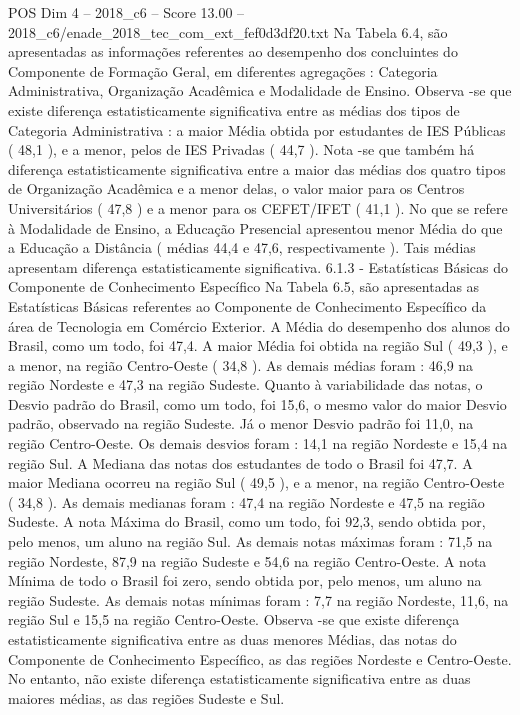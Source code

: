 \begin{textsample}{POS Dim 4 – 2018\_c6 – Score 13.00 – 2018\_c6/enade\_2018\_tec\_com\_ext\_fef0d3df20.txt}
Na Tabela 6.4, são apresentadas as informações referentes ao desempenho dos concluintes do Componente de Formação Geral, em diferentes agregações : Categoria Administrativa, Organização Acadêmica e Modalidade de Ensino.
Observa -se que existe diferença estatisticamente significativa entre as médias dos tipos de Categoria Administrativa : a maior Média obtida por estudantes de IES Públicas ( 48,1 ), e a menor, pelos de IES Privadas ( 44,7 ).
Nota -se que também há diferença estatisticamente significativa entre a maior das médias dos quatro tipos de Organização Acadêmica e a menor delas, o valor maior para os Centros Universitários ( 47,8 ) e a menor para os CEFET/IFET ( 41,1 ).
No que se refere à Modalidade de Ensino, a Educação Presencial apresentou menor Média do que a Educação a Distância ( médias 44,4 e 47,6, respectivamente ).
Tais médias apresentam diferença estatisticamente significativa. 6.1.3 - Estatísticas Básicas do Componente de Conhecimento Específico Na Tabela 6.5, são apresentadas as Estatísticas Básicas referentes ao Componente de Conhecimento Específico da área de Tecnologia em Comércio Exterior.
A Média do desempenho dos alunos do Brasil, como um todo, foi 47,4.
A maior Média foi obtida na região Sul ( 49,3 ), e a menor, na região Centro-Oeste ( 34,8 ).
As demais médias foram : 46,9 na região Nordeste e 47,3 na região Sudeste.
Quanto à variabilidade das notas, o Desvio padrão do Brasil, como um todo, foi 15,6, o mesmo valor do maior Desvio padrão, observado na região Sudeste.
Já o menor Desvio padrão foi 11,0, na região Centro-Oeste.
Os demais desvios foram : 14,1 na região Nordeste e 15,4 na região Sul.
A Mediana das notas dos estudantes de todo o Brasil foi 47,7.
A maior Mediana ocorreu na região Sul ( 49,5 ), e a menor, na região Centro-Oeste ( 34,8 ).
As demais medianas foram : 47,4 na região Nordeste e 47,5 na região Sudeste.
A nota Máxima do Brasil, como um todo, foi 92,3, sendo obtida por, pelo menos, um aluno na região Sul.
As demais notas máximas foram : 71,5 na região Nordeste, 87,9 na região Sudeste e 54,6 na região Centro-Oeste.
A nota Mínima de todo o Brasil foi zero, sendo obtida por, pelo menos, um aluno na região Sudeste.
As demais notas mínimas foram : 7,7 na região Nordeste, 11,6, na região Sul e 15,5 na região Centro-Oeste.
Observa -se que existe diferença estatisticamente significativa entre as duas menores Médias, das notas do Componente de Conhecimento Específico, as das regiões Nordeste e Centro-Oeste.
No entanto, não existe diferença estatisticamente significativa entre as duas maiores médias, as das regiões Sudeste e Sul.

\end{textsample}
